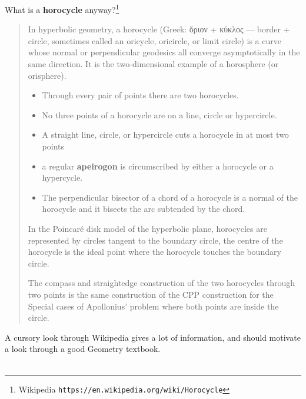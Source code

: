\documentclass[12pt]{article}
\begin{document}
What is a \textbf{horocycle} anyway?\footnote{Wikipedia \texttt{https://en.wikipedia.org/wiki/Horocycle}} 
\begin{quotation} \noindent In hyperbolic geometry, a horocycle (Greek: ὅριον + κύκλος — border + circle, sometimes called an oricycle, oricircle, or limit circle) is a curve whose normal or perpendicular geodesics all converge asymptotically in the same direction. It is the two-dimensional example of a horosphere (or orisphere).
\begin{itemize}
\item Through every pair of points there are two horocycles.
\item No three points of a horocycle are on a line, circle or hypercircle.
\item A straight line, circle, or hypercircle cuts a horocycle in at most two points
\item a regular \textbf{apeirogon} is circumscribed by either a horocycle or a hypercycle.
\item The perpendicular bisector of a chord of a horocycle is a normal of the horocycle and it bisects the arc subtended by the chord.
\end{itemize}
In the Poincar\'{e} disk model of the hyperbolic plane, horocycles are represented by circles tangent to the boundary circle, the centre of the horocycle is the ideal point where the horocycle touches the boundary circle.

The compass and straightedge construction of the two horocycles through two points is the same construction of the CPP construction for the Special cases of Apollonius' problem where both points are inside the circle.
\end{quotation}
A cursory look through Wikipedia gives a lot of information, and should motivate a look through a good Geometry textbook.  \\ \\
\end{document}
